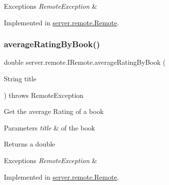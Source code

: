 \begin{DoxyExceptions}{Exceptions}
{\em Remote\+Exception} & \\
\hline
\end{DoxyExceptions}


Implemented in \hyperlink{classserver_1_1remote_1_1_remote_af94163cf6d5c40cfc880eb517d56aa48}{server.\+remote.\+Remote}.

\mbox{\label{interfaceserver_1_1remote_1_1_i_remote_a4a53942c94debc835f1817b2753722de}} 
\subsubsection{\texorpdfstring{average\+Rating\+By\+Book()}{averageRatingByBook()}}
{\footnotesize\ttfamily double server.\+remote.\+I\+Remote.\+average\+Rating\+By\+Book (\begin{DoxyParamCaption}\item[{String}]{title }\end{DoxyParamCaption}) throws Remote\+Exception}

Get the average Rating of a book 
\begin{DoxyParams}{Parameters}
{\em title} & of the book \\
\hline
\end{DoxyParams}
\begin{DoxyReturn}{Returns}
a double 
\end{DoxyReturn}

\begin{DoxyExceptions}{Exceptions}
{\em Remote\+Exception} & \\
\hline
\end{DoxyExceptions}


Implemented in \hyperlink{classserver_1_1remote_1_1_remote_afd253ddc199a34a1e05317878f957cc9}{server.\+remote.\+Remote}.

\mbox{\label{interfaceserver_1_1remote_1_1_i_remote_a11c915f0c22728be1898d46a78ac92cf}} 
